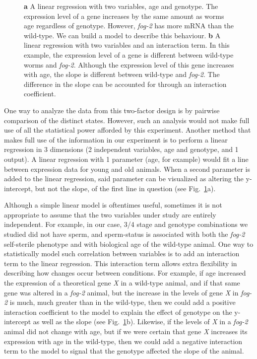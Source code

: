 \documentclass[10pt,letterpaper,twocolumn]{article}
\newcommand{\fog}{\emph{\mbox{fog-2}}}
\begin{document}
\begin{figure}[htbp]
\caption{\textbf{a} A linear regression with two variables, age and genotype. The expression level of a gene increases by the same amount as worms age regardless of genotype. However, \fog{} has more mRNA than the wild-type. We can build a model to describe this behaviour.
\textbf{b} A linear regression with two variables and an interaction term. In this example, the expression level of a gene is different between wild-type worms and \fog{}. Although the expression level of this gene increases with age, the slope is different between wild-type and \fog{}. The difference in the slope can be accounted for through an interaction coefficient.
}
\label{fig:linear_reg}
\end{figure}

One way to analyze the data from this two-factor design is by pairwise comparison of the distinct states. However, such an analysis would not make full use of all the statistical power afforded by this experiment. Another method that makes full use of the information in our experiment is to perform a linear regression in 3 dimensions (2 independent variables, age and genotype, and 1 output). A linear regression with 1 parameter (age, for example) would fit a line between expression data for young and old animals. When a second parameter is added to the linear regression, said parameter can be visualized as altering the y-intercept, but not the slope, of the first line in question (see Fig.~\ref{fig:linear_reg}a).

Although a simple linear model is oftentimes useful, sometimes it is not appropriate to assume that the two variables under study are entirely independent. For example, in our case, 3/4 stage and genotype combinations we studied did not have sperm, and sperm-status is associated with both the \fog{} self-sterile phenotype and with biological age of the wild-type animal. One way to statistically model such correlation between variables is to add an interaction term to the linear regression.
This interaction term allows extra flexibility in describing how changes occur between conditions. For example, if age increased the expression of a theoretical gene \emph{X} in a wild-type animal, and if that same gene was altered in a \fog{} animal, but the increase in the levels of gene \emph{X} in \fog{} is much, much greater than in the wild-type, then we could add a positive interaction coefficient to the model to explain the effect of genotype on the y-intercept as well as the slope (see Fig.~\ref{fig:linear_reg}b). Likewise, if the levels of \emph{X} in a \fog{} animal did not change with age, but if we were certain that gene \emph{X} increases its expression with age in the wild-type, then we could add a negative interaction term to the model to signal that the genotype affected the slope of the animal.
\end{document}
